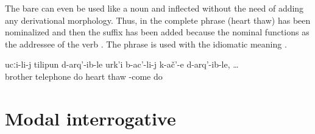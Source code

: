 The bare  can even be used like a noun and inflected without the need of adding any derivational morphology. Thus, in  the complete  phrase  (heart thaw)  has been nominalized and then the  suffix has been added because the nominal functions as the addressee of the verb . The phrase is used with the idiomatic meaning .
%
\begin{exe}
	\ex	\label{ex:When they called the brother}
	\gll	ucːi-li-j	tilipun	d-arq'-ib-le	urk'i	b-ac'-li-j	k-ač'-e	d-arq'-ib-le,	\ldots\\
		brother	telephone	do	heart	thaw		-come	do\\
	\glt	{}
\end{exe}



\section{Modal interrogative}
\label{sec:modalinterrogative}

